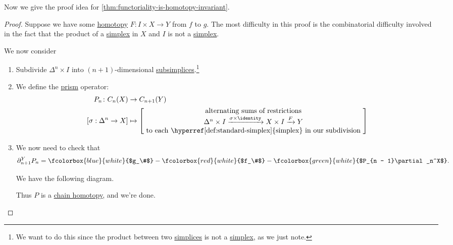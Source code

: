 Now we give the proof idea for \autoref{thm:functoriality-is-homotopy-invariant}.
\begin{proof}
	Suppose we have some \hyperref[def:homotopy]{homotopy} $F \colon I \times X \to Y$ from $f$ to $g$. The most difficulty in this proof is the
	combinatorial difficulty involved in the fact that the product of a \hyperref[def:standard-simplex]{simplex} in $X$ and $I$ is not a \hyperref[def:standard-simplex]{simplex}.

	We now consider
	\begin{enumerate}
		\item Subdivide $\Delta^n \times I$ into $(n + 1)$-dimensional \hyperref[def:subsimplex]{subsimplices}.\footnote{We want to do this since the product between two \hyperref[def:standard-simplex]{simplices} is not a \hyperref[def:standard-simplex]{simplex}, as we just note.}
		      \begin{figure}[H]
			      \centering
			      \label{fig:pf:functoriality-is-homotopy-invariant}
		      \end{figure}
		\item We define the \underline{prism} operator:
		      \begin{align*}
			      P_n \colon C_n(X)         & \to C_{n + 1}(Y)                                                                                              \\
			      [\sigma : \Delta^n \to X] & \mapsto \begin{bmatrix} \text{ alternating sums of restrictions }                                             \\
				                                          \Delta^n \times I \xrightarrow{\sigma \times \identity } X \times I \xrightarrow{F} Y \\
				                                          \text{ to each \hyperref[def:standard-simplex]{simplex} in our subdivision }
			                                          \end{bmatrix}
		      \end{align*}
		\item We now need to check that
		      \[
			      \partial_{n + 1}^YP_n = \fcolorbox{blue}{white}{$g_\#$} - \fcolorbox{red}{white}{$f_\#$} - \fcolorbox{green}{white}{$P_{n - 1}\partial_n^X$}.
		      \]

		      We have the following diagram.
		      \begin{figure}[H]
			      \centering
			      \label{fig:pf:functoriality-is-homotopy-invariant-2}
		      \end{figure}
		      Thus $P$ is a \hyperref[def:chain-homotopy]{chain homotopy}, and we're done.
	\end{enumerate}
\end{proof}

